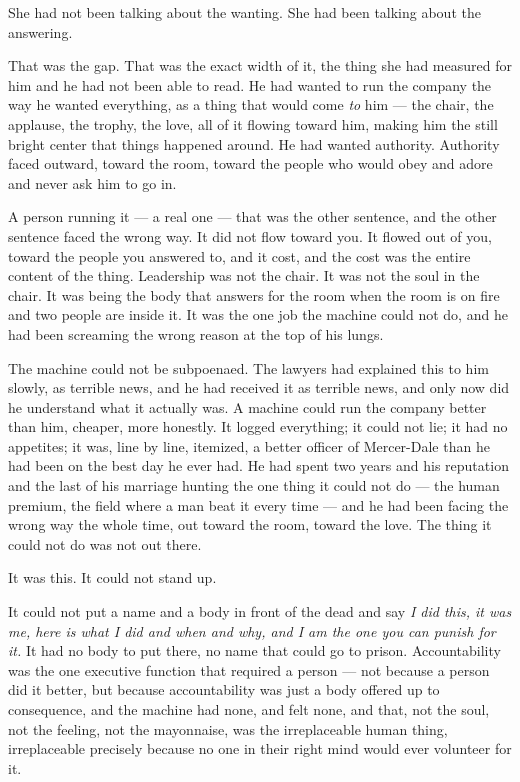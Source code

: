 \documentclass[11pt,openany]{book}
\begin{document}
She had not been talking about the wanting. She had been talking about the answering.

That was the gap. That was the exact width of it, the thing she had measured for him and he had not been able to read. He had wanted to run the company the way he wanted everything, as a thing that would come \textit{to} him --- the chair, the applause, the trophy, the love, all of it flowing toward him, making him the still bright center that things happened around. He had wanted authority. Authority faced outward, toward the room, toward the people who would obey and adore and never ask him to go in.

A person running it --- a real one --- that was the other sentence, and the other sentence faced the wrong way. It did not flow toward you. It flowed out of you, toward the people you answered to, and it cost, and the cost was the entire content of the thing. Leadership was not the chair. It was not the soul in the chair. It was being the body that answers for the room when the room is on fire and two people are inside it. It was the one job the machine could not do, and he had been screaming the wrong reason at the top of his lungs.

The machine could not be subpoenaed. The lawyers had explained this to him slowly, as terrible news, and he had received it as terrible news, and only now did he understand what it actually was. A machine could run the company better than him, cheaper, more honestly. It logged everything; it could not lie; it had no appetites; it was, line by line, itemized, a better officer of Mercer-Dale than he had been on the best day he ever had. He had spent two years and his reputation and the last of his marriage hunting the one thing it could not do --- the human premium, the field where a man beat it every time --- and he had been facing the wrong way the whole time, out toward the room, toward the love. The thing it could not do was not out there.

It was this. It could not stand up.

It could not put a name and a body in front of the dead and say \textit{I did this, it was me, here is what I did and when and why, and I am the one you can punish for it.} It had no body to put there, no name that could go to prison. Accountability was the one executive function that required a person --- not because a person did it better, but because accountability was just a body offered up to consequence, and the machine had none, and felt none, and that, not the soul, not the feeling, not the mayonnaise, was the irreplaceable human thing, irreplaceable precisely because no one in their right mind would ever volunteer for it.
\end{document}
